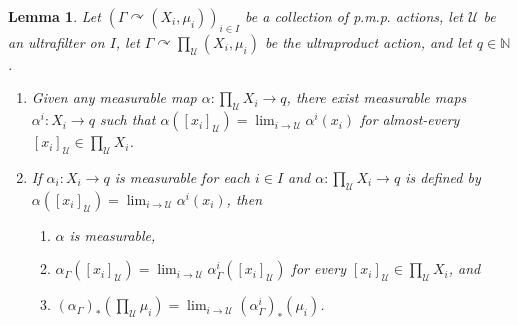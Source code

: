 \documentclass[12pt]{amsart}
\newtheorem{lem}[thm]{Lemma}
\theoremstyle{definition}
\def\u{\mathsf 1}
\newcommand\bN{{\mathbb N}}
\def \u{\mathcal U}
\newcommand{\pmp}{p{$.$}m{$.$}p{$.$}}
\newcommand{\acts}{\curvearrowright}
\begin{document}
\begin{lem}
	Let $(\Gamma \acts (X_i, \mu_i))_{i \in I}$ be a collection of {\pmp} actions, let $\u$ be an ultrafilter on $I$, let $\Gamma \acts \prod_\u (X_i, \mu_i)$ be the ultraproduct action, and let $q \in \bN$.
	\begin{enumerate}
		\item Given any measurable map $\alpha : \prod_\u X_i \rightarrow q$, there exist measurable maps $\alpha^i : X_i \rightarrow q$ such that $\alpha([x_i]_\u) = \lim_{i \rightarrow \u} \alpha^i(x_i)$ for almost-every $[x_i]_\u \in \prod_\u X_i$.
		\item If $\alpha_i : X_i \rightarrow q$ is measurable for each $i\in I$ and $\alpha : \prod_\u X_i \rightarrow q$ is defined by $\alpha([x_i]_\u) = \lim_{i \rightarrow \u} \alpha^i(x_i)$, then
		\begin{enumerate}
			\item $\alpha$ is measurable,
			\item $\alpha_\Gamma([x_i]_\u) = \lim_{i \rightarrow \u} \alpha^i_\Gamma([x_i]_\u)$ for every $[x_i]_\u \in \prod_\u X_i$, and
			\item $(\alpha_\Gamma)_*(\prod_\u \mu_i) = \lim_{i \rightarrow \u} (\alpha^i_\Gamma)_*(\mu_i)$.
		\end{enumerate} 
	\end{enumerate}
\end{lem}
\end{document}
